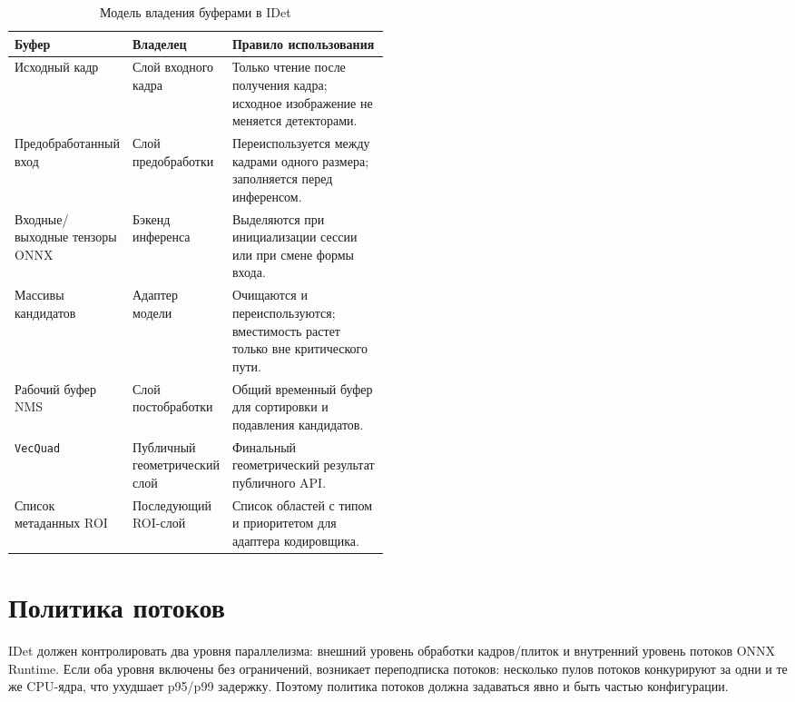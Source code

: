 \documentclass[12pt,a4paper,oneside,openany]{report}
\begin{document}
\begin{table}[H]\centering\caption{Модель владения буферами в IDet}\label{tab:buffer_ownership}\small\begin{tabularx}{\linewidth}{@{}P{0.24\linewidth}P{0.24\linewidth}Y@{}}\toprule
Буфер & Владелец & Правило использования \\
\midrule
Исходный кадр & Слой входного кадра & Только чтение после получения кадра; исходное изображение не меняется детекторами. \\
Предобработанный вход & Слой предобработки & Переиспользуется между кадрами одного размера; заполняется перед инференсом. \\
Входные/выходные тензоры ONNX & Бэкенд инференса & Выделяются при инициализации сессии или при смене формы входа. \\
Массивы кандидатов & Адаптер модели & Очищаются и переиспользуются; вместимость растет только вне критического пути. \\
Рабочий буфер NMS & Слой постобработки & Общий временный буфер для сортировки и подавления кандидатов. \\
\texttt{VecQuad} & Публичный геометрический слой & Финальный геометрический результат публичного API. \\
Список метаданных ROI & Последующий ROI-слой & Список областей с типом и приоритетом для адаптера кодировщика. \\
\bottomrule\end{tabularx}
\end{table}

\section{Политика потоков}

IDet должен контролировать два уровня параллелизма: внешний уровень обработки кадров/плиток и внутренний уровень потоков ONNX Runtime. Если оба уровня включены без ограничений, возникает переподписка потоков: несколько пулов потоков конкурируют за одни и те же CPU-ядра, что ухудшает p95/p99 задержку. Поэтому политика потоков должна задаваться явно и быть частью конфигурации.
\end{document}
